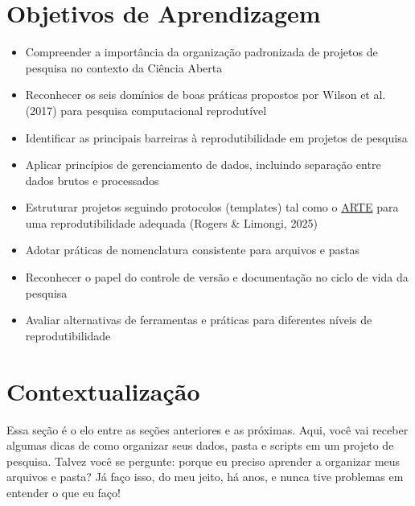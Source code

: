 \documentclass[
  a4paper,
]{book}
\providecommand{\tightlist}{%
  \setlength{\itemsep}{0pt}\setlength{\parskip}{0pt}}\usepackage{longtable,booktabs,array}
\newcommand{\emojitext}[1]{{\emoji #1}}
\begin{document}
\section{Objetivos de Aprendizagem}\label{objetivos-de-aprendizagem-3}

\begin{tcolorbox}[enhanced jigsaw, colback=white, toptitle=1mm, opacityback=0, left=2mm, rightrule=.15mm, title={\emojitext{🎯} Ao final deste módulo, você será capaz de:}, coltitle=black, opacitybacktitle=0.6, breakable, toprule=.15mm, bottomtitle=1mm, titlerule=0mm, bottomrule=.15mm, arc=.35mm, leftrule=.75mm, colframe=quarto-callout-tip-color-frame, colbacktitle=quarto-callout-tip-color!10!white]

\begin{itemize}
\tightlist
\item
  Compreender a importância da organização padronizada de projetos de
  pesquisa no contexto da Ciência Aberta
\item
  Reconhecer os seis domínios de boas práticas propostos por Wilson et
  al. (2017) para pesquisa computacional reprodutível
\item
  Identificar as principais barreiras à reprodutibilidade em projetos de
  pesquisa
\item
  Aplicar princípios de gerenciamento de dados, incluindo separação
  entre dados brutos e processados
\item
  Estruturar projetos seguindo protocolos (templates) tal como o
  \href{https://github.com/phdpablo/article-template}{ARTE} para uma
  reprodutibilidade adequada (Rogers \& Limongi, 2025)
\item
  Adotar práticas de nomenclatura consistente para arquivos e pastas
\item
  Reconhecer o papel do controle de versão e documentação no ciclo de
  vida da pesquisa
\item
  Avaliar alternativas de ferramentas e práticas para diferentes níveis
  de reprodutibilidade
\end{itemize}

\end{tcolorbox}

\section{Contextualização}\label{contextualizauxe7uxe3o-3}

Essa seção é o elo entre as seções anteriores e as próximas. Aqui, você
vai receber algumas dicas de como organizar seus dados, pasta e scripts
em um projeto de pesquisa. Talvez você se pergunte: porque eu preciso
aprender a organizar meus arquivos e pasta? Já faço isso, do meu jeito,
há anos, e nunca tive problemas em entender o que eu faço!
\end{document}

